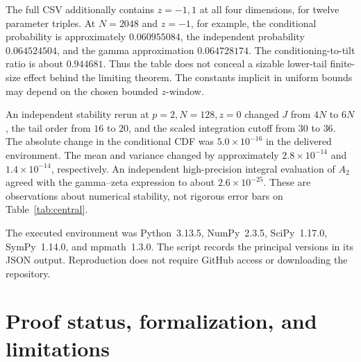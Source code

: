 \documentclass[11pt,a4paper]{article}
\numberwithin{equation}{section}
\theoremstyle{definition}
\theoremstyle{remark}
\begin{document}
The full CSV additionally contains $z=-1,1$ at all four dimensions,
for twelve parameter triples. At $N=2048$ and $z=-1$, for example,
the conditional probability is approximately $0.060955084$, the
independent probability $0.064524504$, and the gamma approximation
$0.064728174$. The conditioning-to-tilt ratio is about $0.944681$.
Thus the table does not conceal a sizable lower-tail finite-size effect
behind the limiting theorem. The constants implicit in uniform bounds
may depend on the chosen bounded $z$-window.

An independent stability rerun at $p=2,N=128,z=0$ changed $J$ from
$4N$ to $6N$, the tail order from $16$ to $20$, and the scaled
integration cutoff from $30$ to $36$. The absolute change in the
conditional CDF was $5.0\times10^{-16}$ in the delivered environment.
The mean and variance changed by approximately
$2.8\times10^{-14}$ and $1.4\times10^{-14}$, respectively.
An independent high-precision integral evaluation of $A_2$ agreed
with the gamma--zeta expression to about $2.6\times10^{-25}$.
These are observations about numerical stability, not rigorous error
bars on Table~\ref{tab:central}.

The executed environment was Python~3.13.5, NumPy~2.3.5,
SciPy~1.17.0, SymPy~1.14.0, and mpmath~1.3.0. The script records the
principal versions in its JSON output. Reproduction does not require
GitHub access or downloading the repository.

\clearpage
\section{Proof status, formalization, and limitations}
\label{sec:status}
\end{document}

